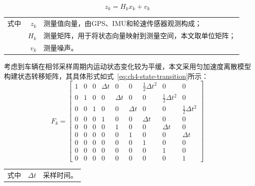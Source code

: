 \begin{equation}
\label{eq:ch4-measurement-model}
z_{k} = H_{k}x_{k} + v_{k}
\end{equation}
\begin{tabularx}{\textwidth}{@{}l@{\quad}r@{———}X@{}}
式中& $z_k$ & 测量值向量，由GPS、IMU和轮速传感器观测构成；\\
& $H_k$ & 测量矩阵，用于将状态向量映射到测量空间，本文取单位矩阵；\\
& $v_k$ & 测量噪声。\\
\end{tabularx}\vspace{3.15bp}

考虑到车辆在相邻采样周期内运动状态变化较为平缓，本文采用匀加速度离散模型构建状态转移矩阵，其具体形式如式~\eqref{eq:ch4-state-transition}所示：
\begin{equation}
\label{eq:ch4-state-transition}
F_{k} = \begin{bmatrix}
1 & 0 & 0 & \Delta t & 0 & 0 & \frac{1}{2}\Delta t^{2} & 0 & 0 \\
0 & 1 & 0 & 0 & \Delta t & 0 & 0 & \frac{1}{2}\Delta t^{2} & 0 \\
0 & 0 & 1 & 0 & 0 & \Delta t & 0 & 0 & \frac{1}{2}\Delta t^{2} \\
0 & 0 & 0 & 1 & 0 & 0 & \Delta t & 0 & 0 \\
0 & 0 & 0 & 0 & 1 & 0 & 0 & \Delta t & 0 \\
0 & 0 & 0 & 0 & 0 & 1 & 0 & 0 & \Delta t \\
0 & 0 & 0 & 0 & 0 & 0 & 1 & 0 & 0 \\
0 & 0 & 0 & 0 & 0 & 0 & 0 & 1 & 0 \\
0 & 0 & 0 & 0 & 0 & 0 & 0 & 0 & 1
\end{bmatrix}
\end{equation}
\begin{tabularx}{\textwidth}{@{}l@{\quad}r@{———}X@{}}
式中& $\Delta t$ & 采样时间。\\
\end{tabularx}\vspace{3.15bp}


